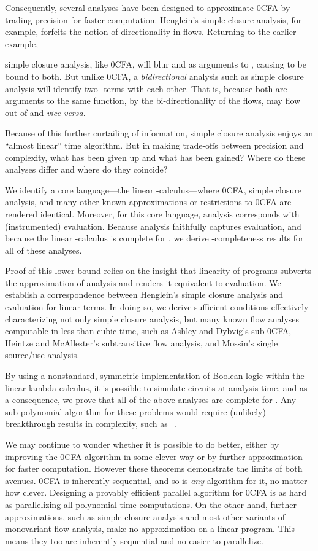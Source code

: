 Consequently, several analyses have been designed to approximate 0CFA
by trading precision for faster computation.  Henglein's simple
closure analysis, for example, forfeits the notion of directionality
in flows.  Returning to the earlier example,

simple closure analysis, like 0CFA, will blur  and
 as arguments to , causing  to be bound to both.
But unlike 0CFA, a {\em bidirectional} analysis such as simple closure
analysis will identify two -terms with each other.  That is,
because both are arguments to the same function, by the
bi-directionality of the flows,  may flow out of  and {\em vice versa}.

Because of this further curtailing of information, simple closure
analysis enjoys an ``almost linear'' time algorithm.  But in making
trade-offs between precision and complexity, what has been given up
and what has been gained?  Where do these analyses differ and where do
they coincide?

We identify a core language---the linear -calculus---where
0CFA, simple closure analysis, and many other known approximations or
restrictions to 0CFA are rendered identical.  Moreover, for this core
language, analysis corresponds with (instrumented) evaluation.
Because analysis faithfully captures evaluation, and because the
linear -calculus is complete for \ptime, we derive
\ptime-completeness results for all of these analyses.

Proof of this lower bound relies on the insight that linearity of
programs subverts the approximation of analysis and renders it
equivalent to evaluation.  We establish a correspondence between
Henglein's simple closure analysis and evaluation for linear terms.
In doing so, we derive sufficient conditions effectively
characterizing not only simple closure analysis, but many known flow
analyses computable in less than cubic time, such as Ashley and
Dybvig's sub-0CFA, Heintze and McAllester's subtransitive flow
analysis, and Mossin's single source/use analysis.

By using a nonstandard, symmetric implementation of Boolean logic
within the linear lambda calculus, it is possible to simulate circuits
at analysis-time, and as a consequence, we prove that all of the above
analyses are complete for \ptime.  Any sub-polynomial algorithm for
these problems would require (unlikely) breakthrough results in
complexity, such as \ptime\  \logspace.

We may continue to wonder whether it is possible to do better, either
by improving the 0CFA algorithm in some clever way or by further
approximation for faster computation.  However these theorems
demonstrate the limits of both avenues.  0CFA is inherently
sequential, and so is {\em any} algorithm for it, no matter how
clever.  Designing a provably efficient parallel algorithm for 0CFA is
as hard as parallelizing all polynomial time computations.  On the
other hand, further approximations, such as simple closure analysis
and most other variants of monovariant flow analysis, make no
approximation on a linear program.  This means they too are inherently
sequential and no easier to parallelize.


